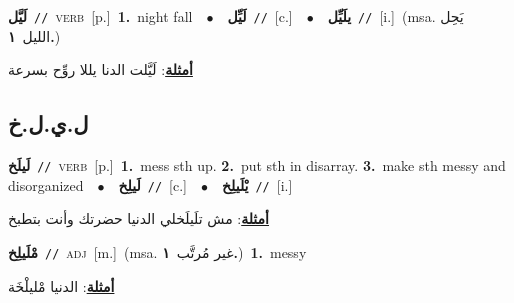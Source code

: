 \documentclass[10pt,a4paper,twoside]{article} %
\begin{document}
\begin{multicols}{2}
{\setlength\topsep{0pt}\textbf{\foreignlanguage{arabic}{لَيَّل}}\ {\color{gray}\texttt{//}\color{black}}\ \textsc{verb}\ [p.]\ \textbf{1.}~night fall\ \ $\bullet$\ \ \setlength\topsep{0pt}\textbf{\foreignlanguage{arabic}{لَيِّل}}\ {\color{gray}\texttt{//}\color{black}}\ [c.]\ \ $\bullet$\ \ \setlength\topsep{0pt}\textbf{\foreignlanguage{arabic}{يلَيِّل}}\ {\color{gray}\texttt{//}\color{black}}\ [i.]\ \color{gray}(msa. \foreignlanguage{arabic}{يَحِل الليل}~\foreignlanguage{arabic}{\textbf{١.}})\color{black}\  \begin{flushright}\color{gray}\foreignlanguage{arabic}{\textbf{\underline{\foreignlanguage{arabic}{أمثلة}}}: لَيَّلت الدنا يللا روِّح بسرعة}\end{flushright}\color{black}} \vspace{2mm}

\vspace{-3mm}
\subsection*{\color{blue}\foreignlanguage{arabic}{ل.ي.ل.خ}\color{blue}{}} 

{\setlength\topsep{0pt}\textbf{\foreignlanguage{arabic}{لَيلَخ}}\ {\color{gray}\texttt{//}\color{black}}\ \textsc{verb}\ [p.]\ \textbf{1.}~mess sth up.  \textbf{2.}~put sth in disarray.  \textbf{3.}~make sth messy and disorganized\ \ $\bullet$\ \ \setlength\topsep{0pt}\textbf{\foreignlanguage{arabic}{لَيلِخ}}\ {\color{gray}\texttt{//}\color{black}}\ [c.]\ \ $\bullet$\ \ \setlength\topsep{0pt}\textbf{\foreignlanguage{arabic}{يْلَيلِخ}}\ {\color{gray}\texttt{//}\color{black}}\ [i.]\  \begin{flushright}\color{gray}\foreignlanguage{arabic}{\textbf{\underline{\foreignlanguage{arabic}{أمثلة}}}: مش تلَيلَخلي الدنيا حضرتك وأنت بتطبخ}\end{flushright}\color{black}} \vspace{2mm}

{\setlength\topsep{0pt}\textbf{\foreignlanguage{arabic}{مْلَيلِخ}}\ {\color{gray}\texttt{//}\color{black}}\ \textsc{adj}\ [m.]\ \color{gray}(msa. \foreignlanguage{arabic}{غير مُرتَّب}~\foreignlanguage{arabic}{\textbf{١.}})\color{black}\ \textbf{1.}~messy\  \begin{flushright}\color{gray}\foreignlanguage{arabic}{\textbf{\underline{\foreignlanguage{arabic}{أمثلة}}}: الدنيا مْليلْخَة}\end{flushright}\color{black}} \vspace{2mm}


\end{multicols}
\end{document}
